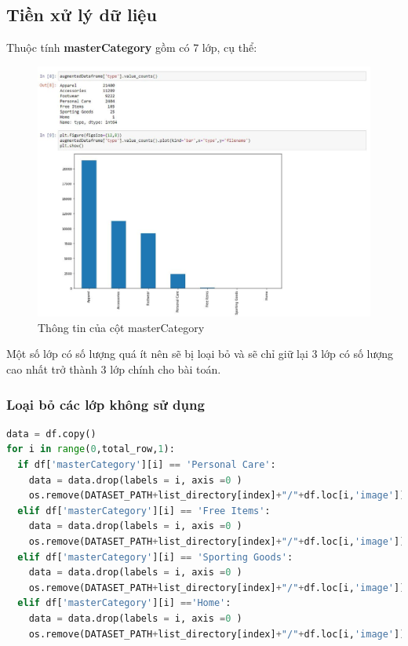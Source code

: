 \newpage
\subsection{Tiền xử lý dữ liệu}
Thuộc tính \textbf{masterCategory} gồm có 7 lớp, cụ thể:
\begin{center}
            \begin{figure}[!h]
                \centering
                \includegraphics[scale = 0.85]{fileanh/4.jpg}
                \caption{Thông tin của cột masterCategory}
            \end{figure}
        \end{center}
\begin{remark}
    Một số lớp có số lượng quá ít nên sẽ bị loại bỏ và sẽ chỉ giữ lại 3 lớp có số lượng cao nhất trở thành 3 lớp chính cho bài toán.
\end{remark}

\subsubsection{Loại bỏ các lớp không sử dụng}
\begin{lstlisting}[language = python]
data = df.copy()
for i in range(0,total_row,1):
  if df['masterCategory'][i] == 'Personal Care':
    data = data.drop(labels = i, axis =0 )
    os.remove(DATASET_PATH+list_directory[index]+"/"+df.loc[i,'image'])
  elif df['masterCategory'][i] == 'Free Items':
    data = data.drop(labels = i, axis =0 )
    os.remove(DATASET_PATH+list_directory[index]+"/"+df.loc[i,'image'])
  elif df['masterCategory'][i] == 'Sporting Goods':
    data = data.drop(labels = i, axis =0 )
    os.remove(DATASET_PATH+list_directory[index]+"/"+df.loc[i,'image'])
  elif df['masterCategory'][i] =='Home':
    data = data.drop(labels = i, axis =0 )
    os.remove(DATASET_PATH+list_directory[index]+"/"+df.loc[i,'image'])
\end{lstlisting}

